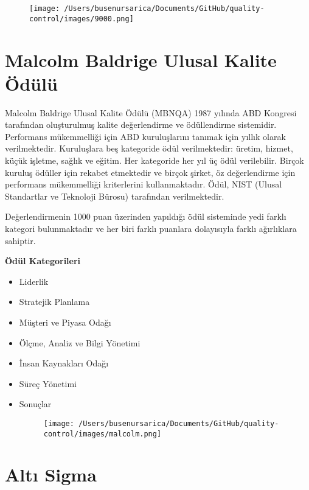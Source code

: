\documentclass[
]{book}
\providecommand{\tightlist}{%
  \setlength{\itemsep}{0pt}\setlength{\parskip}{0pt}}
\begin{document}
\begin{figure}
\centering
\texttt{[image: /Users/busenursarica/Documents/GitHub/quality-control/images/9000.png]}
\end{figure}


\hypertarget{malcolm-baldrige-ulusal-kalite-uxf6duxfcluxfc}{%
\section{Malcolm Baldrige Ulusal Kalite Ödülü}\label{malcolm-baldrige-ulusal-kalite-uxf6duxfcluxfc}}

Malcolm Baldrige Ulusal Kalite Ödülü (MBNQA) 1987 yılında ABD Kongresi tarafından oluşturulmuş kalite değerlendirme ve ödüllendirme sistemidir. Performans mükemmelliği için ABD kuruluşlarını tanımak için yıllık olarak verilmektedir. Kuruluşlara beş kategoride ödül verilmektedir: üretim, hizmet, küçük işletme, sağlık ve eğitim. Her kategoride her yıl üç ödül verilebilir. Birçok kuruluş ödüller için rekabet etmektedir ve birçok şirket, öz değerlendirme için performans mükemmelliği kriterlerini kullanmaktadır. Ödül, NIST (Ulusal Standartlar ve Teknoloji Bürosu) tarafından verilmektedir.

Değerlendirmenin 1000 puan üzerinden yapıldığı ödül sisteminde yedi farklı kategori bulunmaktadır ve her biri farklı puanlara dolayısıyla farklı ağırlıklara sahiptir.

\textbf{Ödül Kategorileri}

\begin{itemize}
\tightlist
\item
  Liderlik
\item
  Stratejik Planlama
\item
  Müşteri ve Piyasa Odağı
\item
  Ölçme, Analiz ve Bilgi Yönetimi
\item
  İnsan Kaynakları Odağı
\item
  Süreç Yönetimi
\item
  Sonuçlar


\begin{figure}
\centering
\texttt{[image: /Users/busenursarica/Documents/GitHub/quality-control/images/malcolm.png]}
\end{figure}

\end{itemize}

\hypertarget{altux131-sigma}{%
\section{Altı Sigma}\label{altux131-sigma}}
\end{document}
